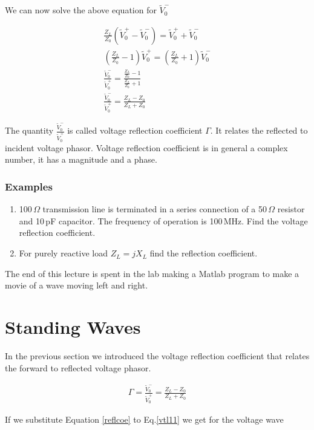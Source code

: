 \documentclass{ximera}
\begin{document}
We can now solve the above equation for $\tilde{V}_0^-$

\begin{eqnarray}
\frac{Z_L}{Z_0} (\tilde{V}_0^+ - \tilde{V}_0^-) = \tilde{V}_0^+ + \tilde{V}_0^- \nonumber \\
(\frac{Z_L}{Z_0}-1)\tilde{V}_0^+ =(\frac{Z_L}{Z_0}+1) \tilde{V}_0^- \nonumber \\
\frac{\tilde{V}_0^-}{\tilde{V}_0^+} = \frac{\frac{Z_L}{Z_0}-1  }{ \frac{Z_L}{Z_0}+1 }
\nonumber \\
\frac{\tilde{V}_0^-}{\tilde{V}_0^+} = \frac{Z_L -Z_0}{Z_L +Z_0}
\end{eqnarray}

The quantity $\frac{\tilde{V}_0^-}{\tilde{V}_0^+}$ is called voltage reflection
coefficient $\Gamma$. It relates the reflected to incident voltage
phasor. Voltage reflection coefficient is in general a complex number,
it has a magnitude and a phase.



\subsubsection{Examples}


 \begin{enumerate}
\item 100\,$\Omega$ transmission line is terminated in a series
connection of a 50\,$\Omega$ resistor and 10\,pF capacitor. The frequency
of operation is 100\,MHz. Find the voltage reflection coefficient.
\item For purely reactive load $Z_L=j X_L$ find the reflection
coefficient.
\end{enumerate}

The end of this lecture is spent in the lab making a Matlab program to
make a movie of a wave moving left and right.


\section{Standing Waves}


In the previous section we introduced the voltage reflection
coefficient that relates the forward to reflected voltage phasor.


\begin{eqnarray}
\Gamma = \frac{\tilde{V}_0^-}{\tilde{V}_0^+} = \frac{Z_L -Z_0}{Z_L +Z_0} \label{reflcoe}
\end{eqnarray}


If we substitute Equation \ref{reflcoe} to Eq.\ref{vtl11} we get for the voltage wave
\end{document}
